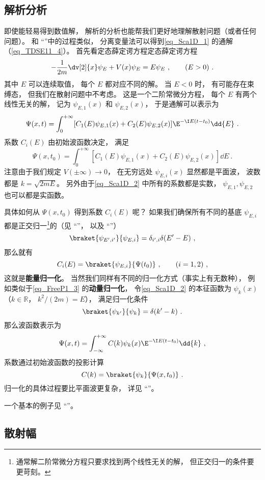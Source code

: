 \subsection{解析分析}
即使能轻易得到数值解， 解析的分析也能帮我们更好地理解散射问题（或者任何问题）。 和 “”中的过程类似， 分离变量法可以得到\autoref{eq_Sca1D_1} 的通解（\autoref{eq_TDSE11_4}）。 首先看定态薛定谔方程定态薛定谔方程
\begin{equation}\label{eq_Sca1D_2}
-\frac{1}{2m}\dv[2]{x}\psi_E + V(x) \psi_E = E \psi_E ~,\qquad (E > 0)~.
\end{equation}
其中 $E$ 可以连续取值， 每个 $E$ 都对应不同的解。 当 $E< 0$ 时， 有可能存在束缚态， 但我们在散射问题中不考虑。 这是一个二阶常微分方程， 每个 $E$ 有两个线性无关的解， 记为 $\psi_{E,1}(x)$ 和 $\psi_{E,2}(x)$， 于是通解可以表示为
\begin{equation}
\Psi(x, t) = \int_0^{+\infty} [C_1(E) \psi_{E,1}(x) + C_2(E) \psi_{E,2}(x)] \E^{-\I E (t-t_0)} \dd{E}~.
\end{equation}
系数 $C_i(E)$ 由初始波函数决定， 满足
\begin{equation}
\Psi(x, t_0) = \int_0^{+\infty} [C_1(E) \psi_{E,1}(x) + C_2(E) \psi_{E,2}(x)] \dd{E}~.
\end{equation}
注意由于我们规定 $V(\pm\infty)\to 0$， 在无穷远处 $\psi_{E,i}(x)$ 显然都是平面波， 波数都是 $k = \sqrt{2mE}$。 另外由于\autoref{eq_Sca1D_2} 中所有的系数都是实数， $\psi_{E,1}, \psi_{E,2}$ 也可以都是实函数。

具体如何从 $\Psi(x, t_0)$ 得到系数 $C_i(E)$ 呢？ 如果我们确保所有不同的基底 $\psi_{E,i}$ 都是正交归一\footnote{通常解二阶常微分方程只要求找到两个线性无关的解， 但正交归一的条件要更苛刻。}的（见 “”， 以及 “”）
\begin{equation}
\braket{\psi_{E',i'}}{\psi_{E,i}} = \delta_{i',i}\delta(E' - E)~,
\end{equation}
那么就有
\begin{equation}
C_i(E) = \braket{\psi_{E,i}}{\Psi(t_0)}~, \qquad (i = 1,2)~,
\end{equation}
这就是\textbf{能量归一化}。 当然我们同样有不同的归一化方式（事实上有无数种）， 例如类似于\autoref{eq_FreeP1_3}  的\textbf{动量归一化}， 令\autoref{eq_Sca1D_2} 的本征函数为 $\psi_{k}(x)$（$k \in \mathbb R$， $k^2/(2m) = E$）， 满足归一化条件
\begin{equation}
\braket{\psi_{k'}}{\psi_{k}} = \delta(k' - k)~.
\end{equation}
那么波函数表示为
\begin{equation}\label{eq_Sca1D_3}
\Psi(x, t) = \int_{-\infty}^{+\infty} C(k) \psi_k(x)\E^{-\I E (t-t_0)} \dd{k}~,
\end{equation}
系数通过初始波函数的投影计算
\begin{equation}
C(k) = \braket{\psi_k}{\Psi(x, t_0)}~.
\end{equation}
归一化的具体过程要比平面波更复杂， 详见 “”。

一个基本的例子见 “”。

\subsection{散射幅}
